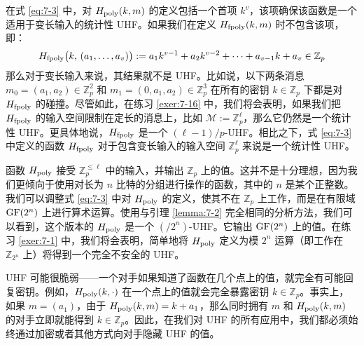 \begin{snote}
在式 \ref{eq:7-3} 中，对 $H_{\rm poly}(k,m)$ 的定义包括一个首项 $k^v$，该项确保该函数是一个适用于变长输入的统计性 UHF。如果我们在定义 $H_{\rm fpoly}(k,m)$ 时不包含该项，即： 
\begin{equation}\label{eq:7-5}
H_{\rm fpoly}\big(k,\,(a_1,\dots,a_v)\big):=a_1k^{v-1}+a_2k^{v-2}+\cdots+a_{v-1}k+a_v\in\mathbb{Z}_p
\end{equation}
那么对于变长输入来说，其结果就不是 UHF。比如说，以下两条消息 $m_0=(a_1,a_2)\in\mathbb{Z}^2_p$ 和 $m_1=(0,a_1,a_2)\in\mathbb{Z}^3_p$ 在所有的密钥 $k\in\mathbb{Z}_p$ 下都是对 $H_{\rm fpoly}$ 的碰撞。尽管如此，在练习 \ref{exer:7-16} 中，我们将会表明，如果我们把 $H_{\rm fpoly}$ 的输入空间限制在定长的消息上，比如 $\mathcal{M}:=\mathbb{Z}_p^\ell$，那么它仍然是一个统计性 UHF。更具体地说，$H_{\rm fpoly}$ 是一个 $(\ell-1)/p$-UHF。相比之下，式 \ref{eq:7-3} 中定义的函数 $H_{\rm fpoly}$ 对于包含变长输入的输入空间 $\mathbb{Z}_p^\ell$ 来说是一个统计性 UHF。
\end{snote}

\begin{remark}\label{remark:7-1}
函数 $H_{\rm poly}$ 接受 $\mathbb{Z}^{\leq\ell}_p$ 中的输入，并输出 $\mathbb{Z}_p$ 上的值。这并不是十分理想，因为我们更倾向于使用对长为 $n$ 比特的分组进行操作的函数，其中的 $n$ 是某个正整数。我们可以调整式 \ref{eq:7-3} 中对 $H_{\rm poly}$ 的定义，使其不在 $\mathbb{Z}_p$ 上工作，而是在有限域 ${\rm GF}(2^n)$ 上进行算术运算。使用与引理 \ref{lemma:7-2} 完全相同的分析方法，我们可以看到，这个版本的 $H_{\rm poly}$ 是一个 ${(/2^n)}$-UHF。它输出 ${\rm GF}(2^n)$ 上的值。在练习 \ref{exer:7-1} 中，我们将会表明，简单地将 $H_{\rm poly}$ 定义为模 $2^n$ 运算（即工作在 $\mathbb{Z}_{2^n}$ 上）将得到一个完全不安全的 UHF。
\end{remark}

\begin{snote}
UHF 可能很脆弱——一个对手如果知道了函数在几个点上的值，就完全有可能回复密钥。例如，$H_{\rm poly}(k,\cdot)$ 在一个点上的值就会完全暴露密钥 $k\in\mathbb{Z}_p$。事实上，如果 $m=(a_1)$，由于 $H_{\rm poly}(k,m)=k+a_1$，那么同时拥有 $m$ 和 $H_{\rm poly}(k,m)$ 的对手立即就能得到 $k\in\mathbb{Z}_p$。因此，在我们对 UHF 的所有应用中，我们都必须始终通过加密或者其他方式向对手隐藏 UHF 的值。
\end{snote}

